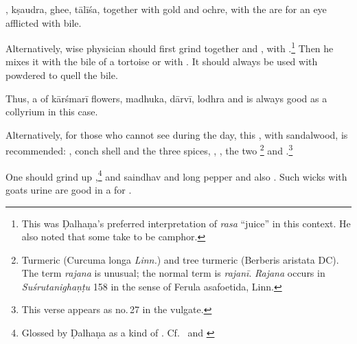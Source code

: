 \begin{translation}
    \item[11cd--12ab]
    
    , \gls{kṣaudra}, ghee,
\gls{tālīśa}, together with gold and ochre, with the
 are for an eye afflicted with bile.
    
    \item [12cd--13] 
    
    Alternatively, wise physician should first grind together 
    and ,  with .\footnote{This was Ḍalhaṇa's preferred interpretation
    of \emph{rasa} “juice” in this context.  He also noted that some take
     to be camphor.}  Then he mixes it with the bile of a
    tortoise or with .  It should always be used
    with powdered  to quell the bile.
    
    \item[14]
    
    Thus, a  of \gls{kārśmarī} flowers, 
    \gls{madhuka},
    \gls{dārvī}, \gls{lodhra} and 
    is always good as a collyrium in this case.
    
    
    \item [15]
    
    Alternatively, for those who cannot see during the day, this ,
    with sandalwood, is recommended: , conch shell and the three
    spices, , , the two
    \footnote{Turmeric (Curcuma longa \textit{Linn.}) and tree
    turmeric (Berberis aristata DC).  The term \emph{rajana} is unusual; the normal
    term is \emph{rajanī}. \emph{Rajana} occurs in \emph{Suśrutanighaṇṭu} 158 in the
    sense of Ferula asafoetida, Linn.} and .\footnote{This verse appears as no.\,27 in the vulgate.}
    
    \item [16] One should grind up ,\footnote{Glossed by Ḍalhaṇa as
    a kind of .\label{srotas-kohl}  Cf.\ 
    \cite[2.M13]{nadk-1954} and 
    \cite[197--198]{shar-1982}}
    and \gls{saindhav} and long pepper and also 
    .  
    Such wicks with goats urine are good in a  for
    \se{kṣaṇadāndhya}{night blindness}.
    

\end{translation}
